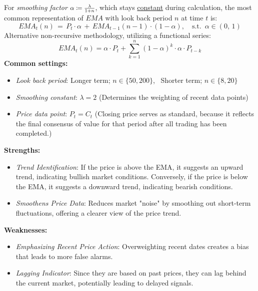 \documentclass[12pt]{article}
\theoremstyle{plain}
\begin{document}
For \textit{smoothing factor}$ \,\, \scalebox{0.9}{$\alpha \coloneq \frac{\lambda}{1 + n}$} $, which stays \underline{constant} during calculation, the most common representation of $E\!M\!A$ with look back period $n$ at time $t$ is:
$$ E\!M\!A_t(n) \, = \, P_t \cdot \alpha \, + \, E\!M\!A_{t - 1}(n-1) \cdot (1 - \alpha ), \quad \text{s.t.} \,\,\, \alpha \in (0, \, 1) $$
Alternative non-recursive methodology, utilizing a functional series:
$$ E\!M\!A_t(n) = \alpha \cdot P_t + \sum_{k=1}^{n} (1 - \alpha)^k \cdot \alpha \cdot P_{t-k} $$
\textbf{Common settings:}
\begin{itemize}
    \item \textit{Look back period}: Longer term; $ n \in \{ 50, 200 \} $, \, Shorter term; $ n \in \{8, 20\}$
    \item \textit{Smoothing constant}: $\lambda = 2 $ (Determines the weighting of recent data points)
    \item \textit{Price data point}: $P_t = C_t$ (Closing price serves as standard, because it reflects the final consensus of value for that period after all trading has been completed.)
    \end{itemize}
\textbf{Strengths:}
\begin{itemize}
    \item \textit{Trend Identification}: If the price is above the EMA, it suggests an upward trend, indicating bullish market conditions. Conversely, if the price is below the EMA, it suggests a downward trend, indicating bearish conditions.
    \item \textit{Smoothens Price Data}:  Reduces market "noise" by smoothing out short-term fluctuations, offering a clearer view of the price trend.
    \end{itemize}
\textbf{Weaknesses:}
\begin{itemize}
    \item \textit{Emphasizing Recent Price Action}: Overweighting recent dates creates a bias that leads to more false alarms. 
    \item \textit{Lagging Indicator}:  Since they are based on past prices, they can lag behind the current market, potentially leading to delayed signals.
\end{itemize}

\end{document}
